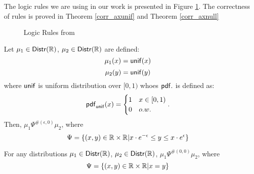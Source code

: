 \documentclass[a4paper,11pt]{article}
\begin{document}
The logic rules we are using in our work is presented in Figure \ref{logic_rule}. The correctness of rules is proved in Theorem \ref{corr_axunif} and Theorem \ref{corr_axnull}

\begin{figure}
\caption{Logic Rules from \cite{barthe2016proving}}
\label{logic_rule}
\end{figure}


\begin{thm}
\label{corr_axunif}
Let $\mu_1 \in \mathsf{Distr}(\mathbb{R})$, $\mu_2 \in \mathsf{Distr}(\mathbb{R})$ are defined:
\[
	{\mu_1}(x) = \mathsf{unif}(x)
\]
\[
	{\mu_2}(y) = {\mathsf{unif}}(y)
\]
where $\mathsf{unif}$ is uniform distribution over $[0, 1)$ whoes $\mathsf{pdf}.$ is defined as:
\[
	\mathsf{pdf}_{\mathsf{unif}}(x) = 
	\begin{cases}
	1 & x \in [0, 1)\\
	0       & o.w.
	\end{cases}.
\]
Then, $\mu_1 \Psi^{\#(\epsilon, 0)} \mu_2$, where
\[
	\Psi = \{(x,y) \in \mathbb{R} \times \mathbb{R} | x \cdot e^{-\epsilon} \leq y \leq x \cdot e^{\epsilon} \}
\]
\end{thm}

\begin{thm}
\label{corr_axnull}
For any distributions $\mu_1 \in \mathsf{Distr}(\mathbb{R})$, $\mu_2 \in \mathsf{Distr}(\mathbb{R})$, $\mu_1 \Psi^{\#(0, 0)} \mu_2$, where
\[
	\Psi = \{(x,y) \in \mathbb{R} \times \mathbb{R} | x = y \}
\]
\end{thm}
\end{document}
